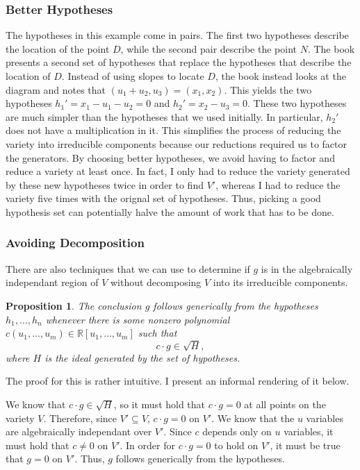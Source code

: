 \documentclass[12pt]{article}
\theoremstyle{plain}
\newtheorem{Proposition}[Theorem]{Proposition}
\theoremstyle{definition}
\theoremstyle{remark}
\begin{document}
\subsubsection{Better Hypotheses}
The hypotheses in this example come in pairs. The first two hypotheses describe the location of the point $D$, while the second pair describe the point $N$.
The book presents a second set of hypotheses that replace the hypotheses that describe the location of $D$.
Instead of using slopes to locate $D$, the book instead looks at the diagram and notes that $(u_1 + u_2,u_3) = (x_1,x_2)$. 
This yields the two hypotheses $h_1'= x_1 - u_1 - u_2 = 0$ and $h_2'= x_2-u_3 = 0$. These two hypotheses are much simpler than the hypotheses that we used initially.
In particular, $h_2'$ does not have a multiplication in it. 
This simplifies the process of reducing the variety into irreducible components because our reductions required us to factor the generators.
By choosing better hypotheses, we avoid having to factor and reduce a variety at least once. 
In fact, I only had to reduce the variety generated by these new hypotheses twice in order to find $V'$, whereas I had to reduce the variety five times with the orignal set of hypotheses.
Thus, picking a good hypothesis set can potentially halve the amount of work that has to be done.
\subsubsection{Avoiding Decomposition}
There are also techniques that we can use to determine if $g$ is in the algebraically independant region of $V$ without decomposing $V$ into its irreducible components.
\begin{Proposition}
    The conclusion $g$ follows generically from the hypotheses $h_1,\dots,h_n$ whenever there is some nonzero polynomial $c(u_1,\dots,u_m) \in \mathbb{R}[u_1,\dots,u_m]$ such that
    $$c \cdot g \in \sqrt{H},$$
    where $H$ is the ideal generated by the set of hypotheses.
\end{Proposition}
The proof for this is rather intuitive. I present an informal rendering of it below.

We know that $c \cdot g \in \sqrt{H}$, so it must hold that $c\cdot g = 0$ at all points on the variety $V$.
Therefore, since $V' \subseteq V$, $c \cdot g = 0$ on $V'$.
We know that the $u$ variables are algebraically independant over $V'$. Since $c$ depends only on $u$ variables, it must hold that $c \not = 0$ on $V'$.
In order for $c \cdot g = 0$ to hold on $V'$, it must be true that $g = 0$ on $V'$. Thus, $g$ follows generically from the hypotheses.
\end{document}
